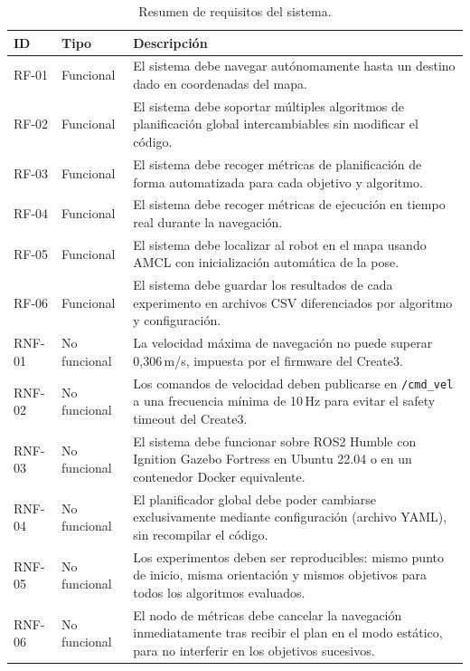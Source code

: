 \begin{table}[H]
\centering
\small
\begin{tabular}{|l|l|p{11cm}|}
\hline
\textbf{ID} & \textbf{Tipo} & \textbf{Descripción} \\
\hline
RF-01 & Funcional & El sistema debe navegar autónomamente hasta un destino dado en coordenadas del mapa. \\
\hline
RF-02 & Funcional & El sistema debe soportar múltiples algoritmos de planificación global intercambiables sin modificar el código. \\
\hline
RF-03 & Funcional & El sistema debe recoger métricas de planificación de forma automatizada para cada objetivo y algoritmo. \\
\hline
RF-04 & Funcional & El sistema debe recoger métricas de ejecución en tiempo real durante la navegación. \\
\hline
RF-05 & Funcional & El sistema debe localizar al robot en el mapa usando AMCL con inicialización automática de la pose. \\
\hline
RF-06 & Funcional & El sistema debe guardar los resultados de cada experimento en archivos CSV diferenciados por algoritmo y configuración. \\
\hline
RNF-01 & No funcional & La velocidad máxima de navegación no puede superar 0,306\,m/s, impuesta por el firmware del Create3. \\
\hline
RNF-02 & No funcional & Los comandos de velocidad deben publicarse en \texttt{/cmd\_vel} a una frecuencia mínima de 10\,Hz para evitar el safety timeout del Create3. \\
\hline
RNF-03 & No funcional & El sistema debe funcionar sobre ROS2 Humble con Ignition Gazebo Fortress en Ubuntu 22.04 o en un contenedor Docker equivalente. \\
\hline
RNF-04 & No funcional & El planificador global debe poder cambiarse exclusivamente mediante configuración (archivo YAML), sin recompilar el código. \\
\hline
RNF-05 & No funcional & Los experimentos deben ser reproducibles: mismo punto de inicio, misma orientación y mismos objetivos para todos los algoritmos evaluados. \\
\hline
RNF-06 & No funcional & El nodo de métricas debe cancelar la navegación inmediatamente tras recibir el plan en el modo estático, para no interferir en los objetivos sucesivos. \\
\hline
\end{tabular}
\caption{Resumen de requisitos del sistema.}
\label{tab:requisitos}
\end{table}

